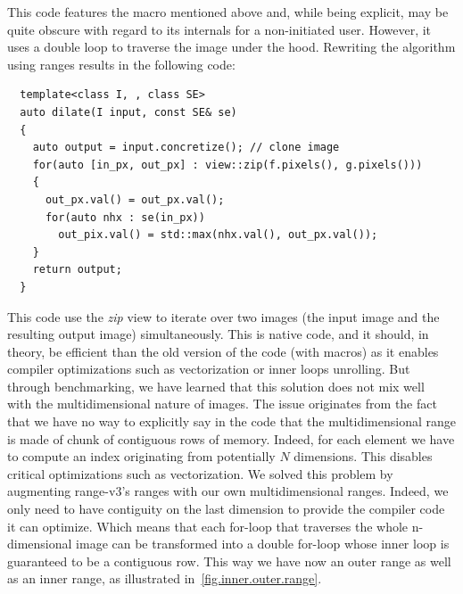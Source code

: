 This code features the macro mentioned above and, while being explicit, may be quite obscure with regard to its
internals for a non-initiated user. However, it uses a double loop to traverse the image under the hood. Rewriting the
algorithm using ranges results in the following code:
\begin{verbatim}
  template<class I, , class SE>
  auto dilate(I input, const SE& se)
  {
    auto output = input.concretize(); // clone image
    for(auto [in_px, out_px] : view::zip(f.pixels(), g.pixels()))
    {
      out_px.val() = out_px.val();
      for(auto nhx : se(in_px))
        out_pix.val() = std::max(nhx.val(), out_px.val());
    }
    return output;
  }
\end{verbatim}
This code use the \emph{zip} view to iterate over two images (the input image and the resulting output image)
simultaneously. This is native code, and it should, in theory, be efficient than the old version of the code (with
macros) as it enables compiler optimizations such as vectorization or inner loops unrolling. But through benchmarking,
we have learned that this solution does not mix well~\parencite{austern.2000.segmented} with the multidimensional nature
of images. The issue originates from the fact that we have no way to explicitly say in the code that the
multidimensional range is made of chunk of contiguous rows of memory. Indeed, for each element we have to compute an
index originating from potentially \(N\) dimensions. This disables critical optimizations such as vectorization. We
solved this problem by augmenting range-v3's ranges with our own multidimensional ranges. Indeed, we only need to have
contiguity on the last dimension to provide the compiler code it can optimize. Which means that each for-loop that
traverses the whole n-dimensional image can be transformed into a double for-loop whose inner loop is guaranteed to be a
contiguous row. This way we have now an outer range as well as an inner range, as illustrated
in~\cref{fig.inner.outer.range}.

